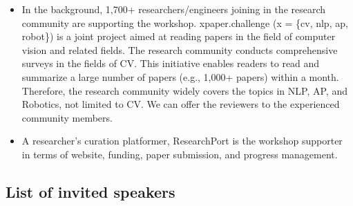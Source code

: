 \documentclass{article}
\begin{document}
\begin{itemize}
    \item In the background, 1,700+ researchers/engineers joining in the research community are supporting the workshop. xpaper.challenge (x = \{cv, nlp, ap, robot\}) is a joint project aimed at reading papers in the field of computer vision and related fields. The research community conducts comprehensive surveys in the fields of CV. This initiative enables readers to read and summarize a large number of papers (e.g., 1,000+ papers) within a month. Therefore, the research community widely covers the topics in NLP, AP, and Robotics, not limited to CV. We can offer the reviewers to the experienced community members.

    \item A researcher’s curation platformer, ResearchPort is the workshop supporter in terms of website, funding, paper submission, and progress management.
\end{itemize}

\subsection{List of invited speakers}
\end{document}
